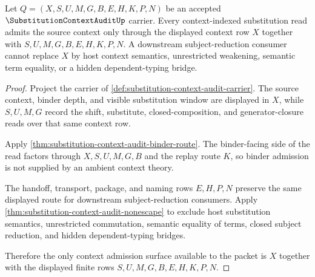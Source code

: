 \begin{theorem}
\label{thm:substitution-context-audit-context-admission}
Let $Q=(X,S,U,M,G,B,E,H,K,P,N)$ be an accepted $\SubstitutionContextAuditUp$ carrier. Every context-indexed substitution read admits the source context only through the displayed context row $X$ together with $S,U,M,G,B,E,H,K,P,N$. A downstream subject-reduction consumer cannot replace $X$ by host context semantics, unrestricted weakening, semantic term equality, or a hidden dependent-typing bridge.
\end{theorem}
\begin{proof}
Project the carrier of \autoref{def:substitution-context-audit-carrier}. The source context, binder depth, and visible substitution window are displayed in $X$, while $S,U,M,G$ record the shift, substitute, closed-composition, and generator-closure reads over that same context row.

Apply \autoref{thm:substitution-context-audit-binder-route}. The binder-facing side of the read factors through $X,S,U,M,G,B$ and the replay route $K$, so binder admission is not supplied by an ambient context theory.

The handoff, transport, package, and naming rows $E,H,P,N$ preserve the same displayed route for downstream subject-reduction consumers. Apply \autoref{thm:substitution-context-audit-nonescape} to exclude host substitution semantics, unrestricted commutation, semantic equality of terms, closed subject reduction, and hidden dependent-typing bridges.

Therefore the only context admission surface available to the packet is $X$ together with the displayed finite rows $S,U,M,G,B,E,H,K,P,N$.
\end{proof}

